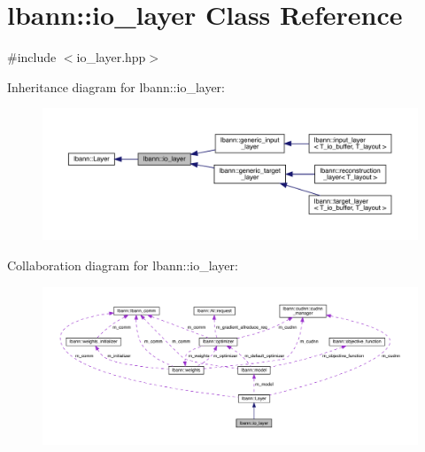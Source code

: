 \hypertarget{classlbann_1_1io__layer}{}\section{lbann\+:\+:io\+\_\+layer Class Reference}
\label{classlbann_1_1io__layer}


{\ttfamily \#include $<$io\+\_\+layer.\+hpp$>$}



Inheritance diagram for lbann\+:\+:io\+\_\+layer\+:\nopagebreak
\begin{figure}[H]
\begin{center}
\leavevmode
\includegraphics[width=350pt]{classlbann_1_1io__layer__inherit__graph}
\end{center}
\end{figure}


Collaboration diagram for lbann\+:\+:io\+\_\+layer\+:\nopagebreak
\begin{figure}[H]
\begin{center}
\leavevmode
\includegraphics[width=350pt]{classlbann_1_1io__layer__coll__graph}
\end{center}
\end{figure}
